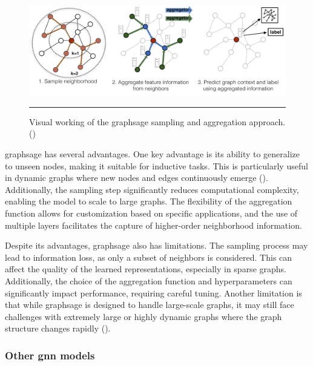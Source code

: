 \begin{figure}[htbp]
    \centering
 \includegraphics[width=.9\textwidth]{03_Figures/literature-review/graphsage-approach.png}
     \rule{35em}{0.5pt}
    \caption{Visual working of the \gls{graphsage} sampling and aggregation approach. (\cite{Hamilton2017})} 
 \label{fig:graphsage-approach}
\end{figure}

\gls{graphsage} has several advantages.
One key advantage is its ability to generalize to unseen nodes, making it suitable for inductive tasks.
This is particularly useful in dynamic graphs where new nodes and edges continuously emerge (\cite{Hamilton2017}).
Additionally, the sampling step significantly reduces computational complexity, enabling the model to scale to large graphs.
The flexibility of the aggregation function allows for customization based on specific applications, and the use of multiple layers facilitates the capture of higher-order neighborhood information.

Despite its advantages, \gls{graphsage} also has limitations.
The sampling process may lead to information loss, as only a subset of neighbors is considered.
This can affect the quality of the learned representations, especially in sparse graphs.
Additionally, the choice of the aggregation function and hyperparameters can significantly impact performance, requiring careful tuning.
Another limitation is that while \gls{graphsage} is designed to handle large-scale graphs, it may still face challenges with extremely large or highly dynamic graphs where the graph structure changes rapidly (\cite{Wu2021}).

\subsubsection*{Other \gls{gnn} models}

